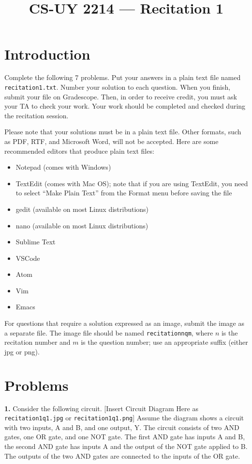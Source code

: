 \documentclass{article}
\title{CS-UY 2214 — Recitation 1}
\date{}
\begin{document}
\maketitle

\section*{Introduction}
Complete the following 7 problems. Put your answers in a plain text file named \texttt{recitation1.txt}. Number your solution to each question. When you finish, submit your file on Gradescope. Then, in order to receive credit, you must ask your TA to check your work. Your work should be completed and checked during the recitation session.

Please note that your solutions must be in a plain text file. Other formats, such as PDF, RTF, and Microsoft Word, will not be accepted. Here are some recommended editors that produce plain text files:
\begin{itemize}
    \item Notepad (comes with Windows)
    \item TextEdit (comes with Mac OS); note that if you are using TextEdit, you need to select “Make Plain Text” from the Format menu before saving the file
    \item gedit (available on most Linux distributions)
    \item nano (available on most Linux distributions)
    \item Sublime Text
    \item VSCode
    \item Atom
    \item Vim
    \item Emacs
\end{itemize}

For questions that require a solution expressed as an image, submit the image as a separate file. The image file should be named \texttt{recitationnqm}, where $n$ is the recitation number and $m$ is the question number; use an appropriate suffix (either jpg or png).

\section*{Problems}
\noindent\textbf{1.} Consider the following circuit.  [Insert Circuit Diagram Here as \texttt{recitation1q1.jpg} or \texttt{recitation1q1.png}]  Assume the diagram shows a circuit with two inputs, A and B, and one output, Y.  The circuit consists of two AND gates, one OR gate, and one NOT gate.  The first AND gate has inputs A and B, the second AND gate has inputs A and the output of the NOT gate applied to B. The outputs of the two AND gates are connected to the inputs of the OR gate.
\end{document}
